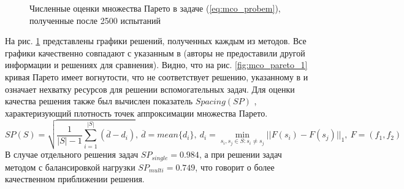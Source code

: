 \documentclass[11pt, oneside, a4paper]{article}
\begin{document}
\begin{figure}[ht]
    \centering
    \caption{Численные оценки множества Парето в задаче (\ref{eq:mco_probem}), полученные после 2500 испытаний}
    \label{fig:mco_pareto}
\end{figure}

На рис. \ref{fig:mco_pareto} представлены графики решений, полученных каждым из методов.
Все графики качественно совпадают с указанным в \cite{BinhKorn1999} (авторы не предоставили другой
информации и решениях для сравнения). Видно, что на рис. \ref{fig:mco_pareto_1}
кривая Парето имеет вогнутости, что не соответствует решению, указанному в \cite{BinhKorn1999} и
означает нехватку ресурсов для решении вспомогательных задач.
Для оценки качества решения также был вычислен показатель \(Spacing(SP)\) \cite{RiquelmeLucken2015},
характеризующий плотность точек аппроксимации множества Парето.
\begin{displaymath}
  SP(S)=\sqrt{\frac{1}{|S|-1} \sum_{i=1}^{|S|} (\overline{d}-d_i)},
  \:\overline{d}=mean\{d_i\},\:d_i=\min_{s_i,s_j\in S:s_i\ne s_j}||F(s_i)-F(s_j)||_1,\: F=(f_1,f_2)
\end{displaymath}
В случае отдельного решения задач \(SP_{single}=0.984\), а при решении задач методом с балансировкой нагрузки
\(SP_{multi}=0.749\), что говорит о более качественном приближении решения.
\end{document}
